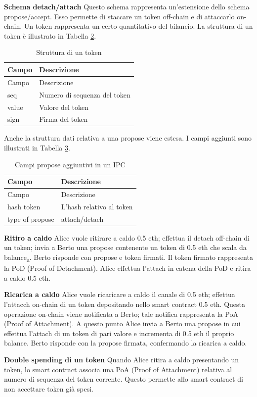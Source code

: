 \documentclass[12pt,italian,]{book}
\begin{document}
\textbf{\textbf{Schema detach/attach}} Questo schema rappresenta un'estensione dello schema propose/accept. Esso permette di staccare un token off-chain e di attaccarlo on-chain. Un token rappresenta un certo quantitativo del bilancio. La struttura di un token è illustrato in Tabella \protect\hyperlink{struct_token}{2}.

\begin{longtable}[]{@{}ll@{}}
\caption{\protect\hypertarget{struct_token}{}{}Struttura di un token}\tabularnewline
\toprule
Campo & Descrizione\tabularnewline
\midrule
\endfirsthead
\toprule
Campo & Descrizione\tabularnewline
\midrule
\endhead
seq & Numero di sequenza del token\tabularnewline
value & Valore del token\tabularnewline
sign & Firma del token\tabularnewline
\bottomrule
\end{longtable}

Anche la struttura dati relativa a una propose viene estesa. I campi aggiunti sono illustrati in Tabella \protect\hyperlink{propose_estesa}{3}.

\begin{longtable}[]{@{}ll@{}}
\caption{\protect\hypertarget{propose_estesa}{}{}Campi propose aggiuntivi in un IPC}\tabularnewline
\toprule
Campo & Descrizione\tabularnewline
\midrule
\endfirsthead
\toprule
Campo & Descrizione\tabularnewline
\midrule
\endhead
hash token & L'hash relativo al token\tabularnewline
type of propose & attach/detach\tabularnewline
\bottomrule
\end{longtable}

\textbf{\textbf{Ritiro a caldo}} Alice vuole ritirare a caldo 0.5 eth; effettua il detach off-chain di un token; invia a Berto una propose contenente un token di 0.5 eth che scala da balance\textsubscript{a}. Berto risponde con propose e token firmati. Il token firmato rappresenta la PoD (Proof of Detachment). Alice effettua l'attach in catena della PoD e ritira a caldo 0.5 eth.

\textbf{\textbf{Ricarica a caldo}} Alice vuole ricaricare a caldo il canale di 0.5 eth; effettua l'attacch on-chain di un token depositando nello smart contract 0.5 eth. Questa operazione on-chain viene notificata a Berto; tale notifica rappresenta la PoA (Proof of Attachment). A questo punto Alice invia a Berto una propose in cui effettua l'attach di un token di pari valore e incrementa di 0.5 eth il proprio balance. Berto risponde con la propose firmata, confermando la ricarica a caldo.

\textbf{\textbf{Double spending di un token}} Quando Alice ritira a caldo presentando un token, lo smart contract associa una PoA (Proof of Attachment) relativa al numero di sequenza del token corrente. Questo permette allo smart contract di non accettare token già spesi.
\end{document}
